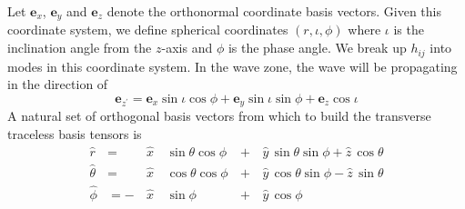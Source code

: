 \documentclass{article}
\numberwithin{equation}{section}
\newcommand{\xhat}{\mathbf{e}_x}
\newcommand{\yhat}{\mathbf{e}_y}
\newcommand{\zhat}{\mathbf{e}_z}
\newcommand{\rhat}{\mathbf{e}_{z^\prime}}
\begin{document}
Let $\xhat$, $\yhat$ and $\zhat$ denote the
orthonormal coordinate basis vectors. Given this coordinate system, we
define spherical coordinates $(r,\iota,\phi)$ where $\iota$ is the
inclination angle from the $z$-axis and $\phi$ is the phase angle.  We
break up $h_{ij}$ into modes in this coordinate system.
In the wave zone, the wave will be propagating in the direction of
\begin{equation}
  \rhat =  \xhat\sin\iota\cos\phi + \yhat\sin\iota\sin\phi + \zhat\cos\iota
\end{equation}
A natural set of orthogonal basis vectors from which to build the
transverse traceless basis tensors is
\begin{subequations}
  \begin{alignat}{3}
    \hat{r} &=
    &\hat{x}&\,\sin\theta\cos\phi \,&+&\, \hat{y}\,\sin\theta\sin\phi
    + \hat{z}\,\cos\theta \\
    \hat{\theta} &=
    &\hat{x}&\,\cos\theta\cos\phi \,&+&\, \hat{y}\,\cos\theta\sin\phi
    - \hat{z}\,\sin\theta \\
    \hat{\phi} &=
    -\,&\hat{x}&\,\sin\phi \,&+&\, \hat{y}\,\cos\phi
  \end{alignat}
\end{subequations}
\end{document}
